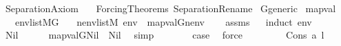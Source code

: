%
\begin{isabellebody}%
%
%
\isadelimdocument
%
\endisadelimdocument
%
\isatagdocument
%
\isamarkuptrue%
%
\endisatagdocument
{\isafolddocument}%
%
\isadelimdocument
%
\endisadelimdocument
%
\isadelimtheory
%
\endisadelimtheory
%
\isatagtheory
{}\isamarkupfalse%
\ Separation{\isacharunderscore}{\kern0pt}Axiom\isanewline
\ \ \ Forcing{\isacharunderscore}{\kern0pt}Theorems\ Separation{\isacharunderscore}{\kern0pt}Rename\isanewline
{}%
\endisatagtheory
{\isafoldtheory}%
%
\isadelimtheory
\isanewline
%
\endisadelimtheory
\isanewline
{}\isamarkupfalse%
\ G{\isacharunderscore}{\kern0pt}generic\isanewline
{}\isanewline
\isanewline
{}\isamarkupfalse%
\ map{\isacharunderscore}{\kern0pt}val\ {\isacharcolon}{\kern0pt}\isanewline
\ \ \ {\isachardoublequoteopen}env{\isasymin}list{\isacharparenleft}{\kern0pt}M{\isacharbrackleft}{\kern0pt}G{\isacharbrackright}{\kern0pt}{\isacharparenright}{\kern0pt}{\isachardoublequoteclose}\isanewline
\ \ \ {\isachardoublequoteopen}{\isasymexists}nenv{\isasymin}list{\isacharparenleft}{\kern0pt}M{\isacharparenright}{\kern0pt}{\isachardot}{\kern0pt}\ env\ {\isacharequal}{\kern0pt}\ map{\isacharparenleft}{\kern0pt}val{\isacharparenleft}{\kern0pt}G{\isacharparenright}{\kern0pt}{\isacharcomma}{\kern0pt}nenv{\isacharparenright}{\kern0pt}{\isachardoublequoteclose}\isanewline
%
\isadelimproof
\ \ %
\endisadelimproof
%
\isatagproof
{}\isamarkupfalse%
\ assms\isanewline
\ \ \isamarkupfalse%
{\isacharparenleft}{\kern0pt}induct\ env{\isacharparenright}{\kern0pt}\isanewline
\ \ \ \ \isamarkupfalse%
\ Nil\isanewline
\ \ \ \ \isamarkupfalse%
\ {\isachardoublequoteopen}map{\isacharparenleft}{\kern0pt}val{\isacharparenleft}{\kern0pt}G{\isacharparenright}{\kern0pt}{\isacharcomma}{\kern0pt}Nil{\isacharparenright}{\kern0pt}\ {\isacharequal}{\kern0pt}\ Nil{\isachardoublequoteclose}\ \isamarkupfalse%
\ simp\isanewline
\ \ \ \ \isamarkupfalse%
\ \isamarkupfalse%
\ {\isacharquery}{\kern0pt}case\ \isamarkupfalse%
\ force\isanewline
\ \ \isamarkupfalse%
\isanewline
\ \ \ \ \isamarkupfalse%
\ {\isacharparenleft}{\kern0pt}Cons\ a\ l{\isacharparenright}{\kern0pt}\isanewline
\ \ \ \ \isamarkupfalse%

\end{isabellebody}
